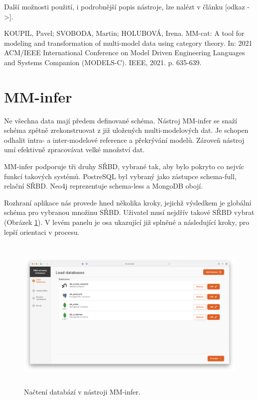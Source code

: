 Další možnosti použití, i podrobnější popis nástroje, lze nalézt v článku [odkaz ->].

KOUPIL, Pavel; SVOBODA, Martin; HOLUBOVÁ, Irena. MM-cat: A tool for modeling and transformation of multi-model data using category theory. In: 2021 ACM/IEEE International Conference on Model Driven Engineering Languages and Systems Companion (MODELS-C). IEEE, 2021. p. 635-639.

\section{MM-infer}

Ne všechna data mají předem definované schéma. Nástroj MM-infer se snaží schéma zpětně zrekonstruovat z již uložených multi-modelových dat. Je schopen odhalit intra- a inter-modelové reference a překrývání modelů. Zároveň nástroj umí efektivně zpracovávat velké množství dat.

MM-infer podporuje tři druhy SŘBD, vybrané tak, aby bylo pokryto co nejvíc funkcí takových systémů. PostreSQL byl vybraný jako zástupce schema-full, relační SŘBD. Neo4j reprezentuje schema-less a MongoDB obojí. 

Rozhraní aplikace nás provede hned několika kroky, jejichž výsledkem je globální schéma pro vybranou množinu SŘBD. Uživatel musí nejdřív takové SŘBD vybrat (Obrázek \ref{obr01:mm-infer-load-database}). V levém panelu je osa ukazující již splněné a následující kroky, pro lepší orientaci v procesu.

\begin{figure}[htb]
  \centering
  \includegraphics[height=75mm]{../img/mm-infer-load-database}
  \caption{Načtení databází v nástroji MM-infer.}
  \label{obr01:mm-infer-load-database}
\end{figure}

